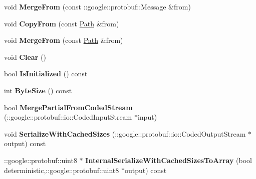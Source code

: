 \begin{DoxyCompactItemize}
\item 
void {\bfseries Merge\+From} (const \+::google\+::protobuf\+::\+Message \&from)\hypertarget{classvss__debug_1_1Path_a9cd41c9f281451c410d4ed15fdef0f4f}{}\label{classvss__debug_1_1Path_a9cd41c9f281451c410d4ed15fdef0f4f}

\item 
void {\bfseries Copy\+From} (const \hyperlink{classvss__debug_1_1Path}{Path} \&from)\hypertarget{classvss__debug_1_1Path_ab030540eb875566f578b849d1e6446b1}{}\label{classvss__debug_1_1Path_ab030540eb875566f578b849d1e6446b1}

\item 
void {\bfseries Merge\+From} (const \hyperlink{classvss__debug_1_1Path}{Path} \&from)\hypertarget{classvss__debug_1_1Path_ae0d112d3a29dad98eedec19eb61cdb8e}{}\label{classvss__debug_1_1Path_ae0d112d3a29dad98eedec19eb61cdb8e}

\item 
void {\bfseries Clear} ()\hypertarget{classvss__debug_1_1Path_ac92857cedc93a91e0410aff6e9b9cb38}{}\label{classvss__debug_1_1Path_ac92857cedc93a91e0410aff6e9b9cb38}

\item 
bool {\bfseries Is\+Initialized} () const \hypertarget{classvss__debug_1_1Path_a3febb2d9f847dfacc28574552f656d43}{}\label{classvss__debug_1_1Path_a3febb2d9f847dfacc28574552f656d43}

\item 
int {\bfseries Byte\+Size} () const \hypertarget{classvss__debug_1_1Path_a70915c20ce71ac7597f1e9b4e4b0f580}{}\label{classvss__debug_1_1Path_a70915c20ce71ac7597f1e9b4e4b0f580}

\item 
bool {\bfseries Merge\+Partial\+From\+Coded\+Stream} (\+::google\+::protobuf\+::io\+::\+Coded\+Input\+Stream $\ast$input)\hypertarget{classvss__debug_1_1Path_a9b4f0f55454313f7a4a70d3a035f2451}{}\label{classvss__debug_1_1Path_a9b4f0f55454313f7a4a70d3a035f2451}

\item 
void {\bfseries Serialize\+With\+Cached\+Sizes} (\+::google\+::protobuf\+::io\+::\+Coded\+Output\+Stream $\ast$output) const \hypertarget{classvss__debug_1_1Path_a6286d44a76f30e0f324734b74b1ae99f}{}\label{classvss__debug_1_1Path_a6286d44a76f30e0f324734b74b1ae99f}

\item 
\+::google\+::protobuf\+::uint8 $\ast$ {\bfseries Internal\+Serialize\+With\+Cached\+Sizes\+To\+Array} (bool deterministic,\+::google\+::protobuf\+::uint8 $\ast$output) const \hypertarget{classvss__debug_1_1Path_a9d09fb5f3273d75d4f6735c47eecc159}{}\label{classvss__debug_1_1Path_a9d09fb5f3273d75d4f6735c47eecc159}


\end{DoxyCompactItemize}
